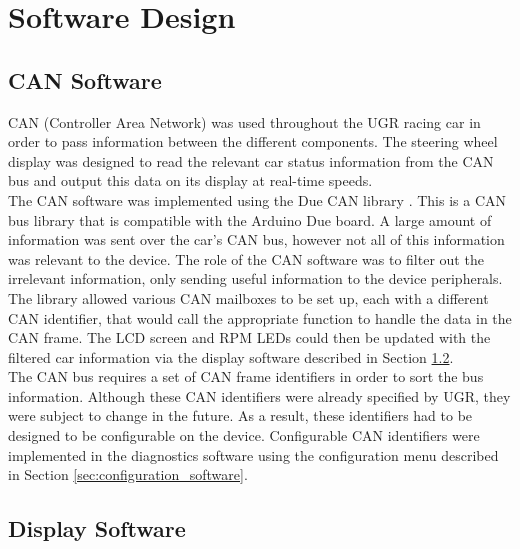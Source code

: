 \documentclass[a4paper,12pt]{article}
\begin{document}

\newpage
\section{Software Design}
\label{sec:software_design}

\subsection{CAN Software}
\label{sec:CAN_software}

CAN (Controller Area Network) was used throughout the UGR racing car in order to pass information between the different components. The steering wheel display was designed to read the relevant car status information from the CAN bus and output this data on its display at real-time speeds. \\

The CAN software was implemented using the Due CAN library \cite{due_can}. This is a CAN bus library that is compatible with the Arduino Due board. A large amount of information was sent over the car’s CAN bus, however not all of this information was relevant to the device. The role of the CAN software was to filter out the irrelevant information, only sending useful information to the device peripherals. The library allowed various CAN mailboxes to be set up, each with a different CAN identifier, that would call the appropriate function to handle the data in the CAN frame. The LCD screen and RPM LEDs could then be updated with the filtered car information via the display software described in Section \ref{sec:display_software}. \\

The CAN bus requires a set of CAN frame identifiers in order to sort the bus information. Although these CAN identifiers were already specified by UGR, they were subject to change in the future. As a result, these identifiers had to be designed to be configurable on the device. Configurable CAN identifiers were implemented in the diagnostics software using the configuration menu described in Section \ref{sec:configuration_software}.

\subsection{Display Software}
\label{sec:display_software}
\end{document}
